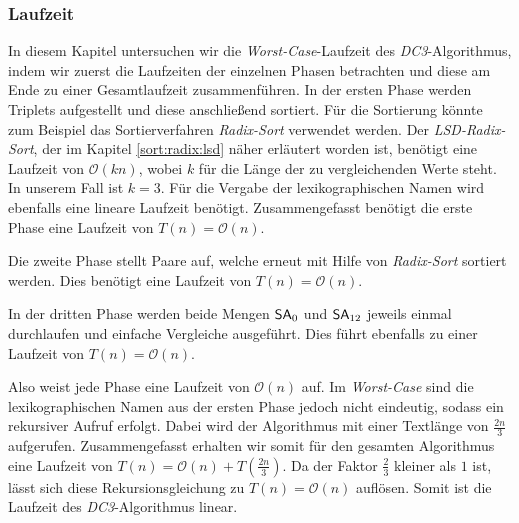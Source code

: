 \subsubsection{Laufzeit}
\label{dc3:algorithmus:laufzeit}

In diesem Kapitel untersuchen wir die \emph{Worst-Case}-Laufzeit des \emph{DC3}-Al\-go\-rith\-mus, indem wir zuerst die Laufzeiten der einzelnen Phasen betrachten und diese am Ende zu einer Gesamtlaufzeit zusammenführen.
In der ersten Phase werden Triplets aufgestellt und diese anschließend sortiert. Für die Sortierung könnte zum Beispiel das Sortierverfahren \emph{Radix-Sort} verwendet werden. Der \emph{LSD-Radix-Sort}, der im Kapitel \ref{sort:radix:lsd} näher erläutert worden ist, benötigt eine Laufzeit von $\mathcal{O}(kn)$, wobei $k$ für die Länge der zu ver\-gleich\-en\-den Werte steht. In unserem Fall ist $k = 3$. Für die Vergabe der lexikographischen Namen wird ebenfalls eine lineare Laufzeit benötigt. Zusammengefasst benötigt die erste Phase eine Laufzeit von $T(n) = \mathcal{O}(n)$.

Die zweite Phase stellt Paare auf, welche erneut mit Hilfe von \emph{Radix-Sort} sortiert werden. Dies benötigt eine Laufzeit von $T(n) = \mathcal{O}(n)$.

In der dritten Phase werden beide Mengen $\sa_{0}$ und $\sa_{12}$ jeweils einmal durchlaufen und einfache Vergleiche ausgeführt. Dies führt ebenfalls zu einer Laufzeit von $T(n) = \mathcal{O}(n)$.

Also weist jede Phase eine Laufzeit von $\mathcal{O}(n)$ auf. Im \emph{Worst-Case} sind die lexikographischen Namen aus der ersten Phase jedoch nicht eindeutig, sodass ein rekursiver Aufruf erfolgt. Dabei wird der Algorithmus mit einer Textlänge von $\frac{2n}{3}$ aufgerufen. Zusammengefasst erhalten wir somit für den gesamten Algorithmus eine Laufzeit von $T(n) = \mathcal{O}(n) + T(\frac{2n}{3})$. Da der Faktor $\frac{2}{3}$ kleiner als $1$ ist, lässt sich diese Rekursionsgleichung zu $T(n) = \mathcal{O}(n)$ auflösen. Somit ist die Laufzeit des \emph{DC3}-Algorithmus linear.